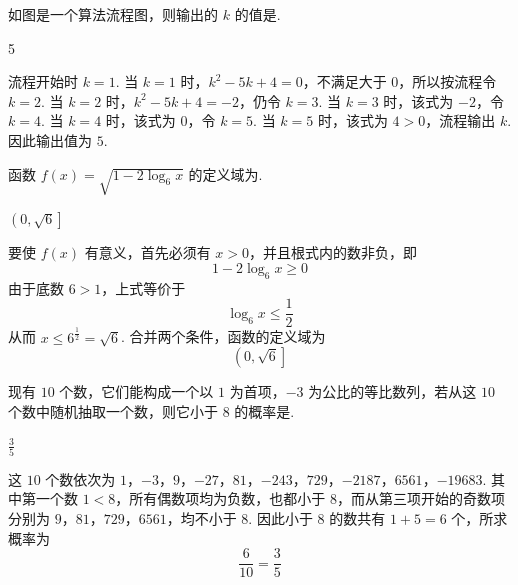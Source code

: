 \begin{problem}
如图是一个算法流程图，则输出的 \(k\) 的值是\fillinblank{}.

\end{problem}

\begin{answer}
5
\end{answer}

\begin{solution}
流程开始时 \(k=1\). 当 \(k=1\) 时，\(k^2-5k+4=0\)，不满足大于 \(0\)，所以按流程令 \(k=2\). 当 \(k=2\) 时，\(k^2-5k+4=-2\)，仍令 \(k=3\). 当 \(k=3\) 时，该式为 \(-2\)，令 \(k=4\). 当 \(k=4\) 时，该式为 \(0\)，令 \(k=5\). 当 \(k=5\) 时，该式为 \(4>0\)，流程输出 \(k\). 因此输出值为 \(5\).
\end{solution}

\begin{problem}
函数 \(f(x)=\sqrt{1-2\log_{6}x}\) 的定义域为\fillinblank{}.
\end{problem}

\begin{answer}
\(\left(0,\sqrt{6}\right]\)
\end{answer}

\begin{solution}
要使 \(f(x)\) 有意义，首先必须有 \(x>0\)，并且根式内的数非负，即
\[
1-2\log_{6}x\geqslant0
\]
由于底数 \(6>1\)，上式等价于
\[
\log_{6}x\leqslant\frac{1}{2}
\]
从而 \(x\leqslant6^{\frac{1}{2}}=\sqrt{6}\). 合并两个条件，函数的定义域为
\[
\left(0,\sqrt{6}\right]
\]
\end{solution}

\begin{problem}
现有 \(10\) 个数，它们能构成一个以 \(1\) 为首项，\(-3\) 为公比的等比数列，若从这 \(10\) 个数中随机抽取一个数，则它小于 \(8\) 的概率是\fillinblank{}.
\end{problem}

\begin{answer}
\(\frac{3}{5}\)
\end{answer}

\begin{solution}
这 \(10\) 个数依次为
\(1\)，\(-3\)，\(9\)，\(-27\)，\(81\)，\(-243\)，\(729\)，\(-2187\)，\(6561\)，\(-19683\).
其中第一个数 \(1<8\)，所有偶数项均为负数，也都小于 \(8\)，而从第三项开始的奇数项分别为 \(9\)，\(81\)，\(729\)，\(6561\)，均不小于 \(8\). 因此小于 \(8\) 的数共有 \(1+5=6\) 个，所求概率为
\[
\frac{6}{10}=\frac{3}{5}
\]
\end{solution}

